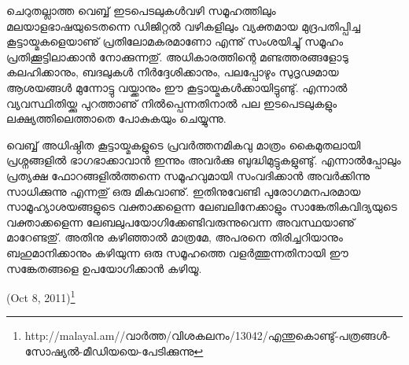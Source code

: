 ചെറുതല്ലാത്ത വെബ്ബ് ഇടപെടലുകള്‍വഴി സമൂഹത്തിലും മലയാളഭാഷയുടെതന്നെ ഡിജിറ്റല്‍ വഴികളിലും വ്യക്തമായ മുദ്രപതിപ്പിച്ച 
കൂട്ടായ്മകളെയാണു് പ്രതിലോമകരമാണോ എന്നു് സംശയിച്ചു് സമൂഹം പ്രതിക്കൂട്ടിലാക്കാന്‍ നോക്കുന്നതു്. അധികാരത്തിന്റെ 
മണ്ടത്തരങ്ങളോടു കലഹിക്കാനും, ബദലുകള്‍ നിര്‍ദ്ദേശിക്കാനും, പലപ്പോഴും സുദൃഢമായ ആശയങ്ങള്‍ മുന്നോട്ടു വയ്ക്കാനും 
ഈ കൂട്ടായ്മകള്‍ക്കായിട്ടുണ്ടു്. എന്നാല്‍ വ്യവസ്ഥിതിയ്ക്കു പുറത്താണു് നില്‍പ്പെന്നതിനാല്‍ പല ഇടപെടലുകളും ലക്ഷ്യത്തിലെത്താതെ
 പോകുകയും ചെയ്യുന്നു.

വെബ്ബ് അധിഷ്ഠിത കൂട്ടായ്മകളുടെ പ്രവര്‍ത്തനമികവു മാത്രം കൈമുതലായി പ്രശ്നങ്ങളില്‍ ഭാഗഭാക്കാവാന്‍ ഇന്നും അവര്‍ക്കു 
ബുദ്ധിമുട്ടുകളുണ്ടു്. എന്നാല്‍പ്പോലും പ്രത്യക്ഷ ഫോറങ്ങളില്‍ത്തന്നെ സമൂഹവുമായി സംവദിക്കാന്‍ അവര്‍ക്കിന്നു സാധിക്കുന്നു 
എന്നതു് ഒരു മികവാണു്. ഇതിനുവേണ്ടി പുരോഗമനപരമായ സാമൂഹ്യാശയങ്ങളുടെ വക്താക്കളെന്ന ലേബലിനേക്കാളും 
സാങ്കേതികവിദ്യയുടെ വക്താക്കളെന്ന ലേബലുപയോഗിക്കേണ്ടിവരുന്നുവെന്ന അവസ്ഥയാണു് മാറേണ്ടതു്. അതിനു കഴിഞ്ഞാല്‍ 
മാത്രമേ, അപരനെ തിരിച്ചറിയാനും ബഹുമാനിക്കാനും കഴിയുന്ന ഒരു സമൂഹത്തെ വളര്‍ത്തുന്നതിനായി ഈ സങ്കേതങ്ങളെ
 ഉപയോഗിക്കാന്‍ കഴിയൂ.

\begin{flushright}(Oct 8, 2011)\footnote{http://malayal.am//വാര്‍ത്ത/വിശകലനം/13042/എന്തുകൊണ്ടു്-പത്രങ്ങള്‍-സോഷ്യല്‍-മീഡിയയെ-പേടിക്കുന്നു}\end{flushright}
\newpage
